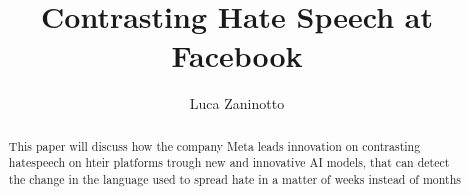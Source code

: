 \documentclass[12pt, a4paper]{article}
\title{Contrasting Hate Speech at Facebook}
\author{
  Luca Zaninotto
}
\begin{document}
\maketitle
\begin{abstract}
  This paper will discuss how the company Meta leads innovation on
  contrasting hatespeech on hteir platforms trough new and innovative
  AI models, that can detect the change in the language used to spread
  hate in a matter of weeks instead of months
\end{abstract}






\printbibliography
\end{document}
